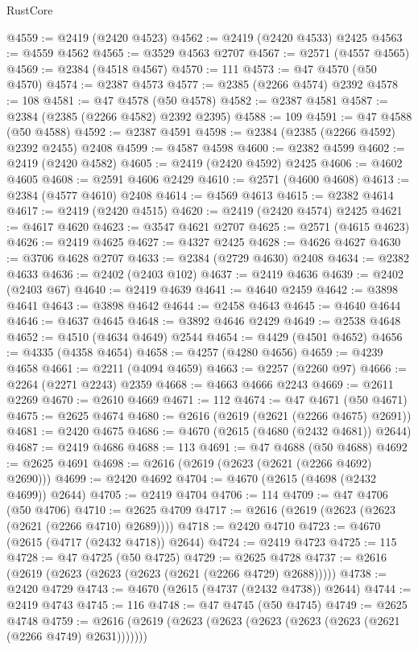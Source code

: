 \begin{lexlean}{RustCore}
\begin{coremodule}
@4559 := @2419 (@2420 @4523)
@4562 := @2419 (@2420 @4533) @2425
@4563 := @4559 @4562
@4565 := @3529 @4563 @2707
@4567 := @2571 (@4557 @4565)
@4569 := @2384 (@4518 @4567)
@4570 := 111
@4573 := @47 @4570 (@50 @4570)
@4574 := @2387 @4573
@4577 := @2385 (@2266 @4574) @2392
@4578 := 108
@4581 := @47 @4578 (@50 @4578)
@4582 := @2387 @4581
@4587 := @2384 (@2385 (@2266 @4582) @2392 @2395)
@4588 := 109
@4591 := @47 @4588 (@50 @4588)
@4592 := @2387 @4591
@4598 := @2384 (@2385 (@2266 @4592) @2392 @2455) @2408
@4599 := @4587 @4598
@4600 := @2382 @4599
@4602 := @2419 (@2420 @4582)
@4605 := @2419 (@2420 @4592) @2425
@4606 := @4602 @4605
@4608 := @2591 @4606 @2429
@4610 := @2571 (@4600 @4608)
@4613 := @2384 (@4577 @4610) @2408
@4614 := @4569 @4613
@4615 := @2382 @4614
@4617 := @2419 (@2420 @4515)
@4620 := @2419 (@2420 @4574) @2425
@4621 := @4617 @4620
@4623 := @3547 @4621 @2707
@4625 := @2571 (@4615 @4623)
@4626 := @2419 @4625
@4627 := @4327 @2425
@4628 := @4626 @4627
@4630 := @3706 @4628 @2707
@4633 := @2384 (@2729 @4630) @2408
@4634 := @2382 @4633
@4636 := @2402 (@2403 @102)
@4637 := @2419 @4636
@4639 := @2402 (@2403 @67)
@4640 := @2419 @4639
@4641 := @4640 @2459
@4642 := @3898 @4641
@4643 := @3898 @4642
@4644 := @2458 @4643
@4645 := @4640 @4644
@4646 := @4637 @4645
@4648 := @3892 @4646 @2429
@4649 := @2538 @4648
@4652 := @4510 (@4634 @4649) @2544
@4654 := @4429 (@4501 @4652)
@4656 := @4335 (@4358 @4654)
@4658 := @4257 (@4280 @4656)
@4659 := @4239 @4658
@4661 := @2211 (@4094 @4659)
@4663 := @2257 (@2260 @97)
@4666 := @2264 (@2271 @2243) @2359
@4668 := @4663 @4666 @2243
@4669 := @2611 @2269
@4670 := @2610 @4669
@4671 := 112
@4674 := @47 @4671 (@50 @4671)
@4675 := @2625 @4674
@4680 := @2616 (@2619 (@2621 (@2266 @4675) @2691))
@4681 := @2420 @4675
@4686 := @4670 (@2615 (@4680 (@2432 @4681)) @2644)
@4687 := @2419 @4686
@4688 := 113
@4691 := @47 @4688 (@50 @4688)
@4692 := @2625 @4691
@4698 := @2616 (@2619 (@2623 (@2621 (@2266 @4692) @2690)))
@4699 := @2420 @4692
@4704 := @4670 (@2615 (@4698 (@2432 @4699)) @2644)
@4705 := @2419 @4704
@4706 := 114
@4709 := @47 @4706 (@50 @4706)
@4710 := @2625 @4709
@4717 := @2616 (@2619 (@2623 (@2623 (@2621 (@2266 @4710) @2689))))
@4718 := @2420 @4710
@4723 := @4670 (@2615 (@4717 (@2432 @4718)) @2644)
@4724 := @2419 @4723
@4725 := 115
@4728 := @47 @4725 (@50 @4725)
@4729 := @2625 @4728
@4737 := @2616 (@2619 (@2623 (@2623 (@2623 (@2621 (@2266 @4729) @2688)))))
@4738 := @2420 @4729
@4743 := @4670 (@2615 (@4737 (@2432 @4738)) @2644)
@4744 := @2419 @4743
@4745 := 116
@4748 := @47 @4745 (@50 @4745)
@4749 := @2625 @4748
@4759 := @2616 (@2619 (@2623 (@2623 (@2623 (@2623 (@2623 (@2621 (@2266 @4749) @2631)))))))

\end{coremodule}
\end{lexlean}
